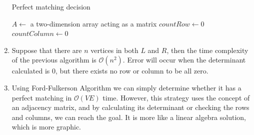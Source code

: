 \documentclass[12pt, a4paper]{article}
\begin{document}
\begin{enumerate}
          \begin{algorithm}[!htb]
              \caption{Perfect matching decision}
              \BlankLine
              \BlankLine
              $A \leftarrow$ a two-dimension array acting as a matrix\;
              \BlankLine
              $countRow \leftarrow 0$\;
              $countColumn \leftarrow 0$\;
              \;
          \end{algorithm}
    \newpage
    \item Suppose that there are $n$ vertices in both $L$ and $R$, then the time complexity of the previous algorithm is $\mathcal{O}(n^2)$. 
          Error will occur when the determinant calculated is $0$, but there exists no row or column to be all zero.
    \item Using Ford-Fulkerson Algorithm we can simply determine whether it has a perfect matching in $\mathcal{O}(VE)$ time. 
          However, this strategy uses the concept of an adjacency matrix, and by calculating its determinant or checking the rows and columns, 
          we can reach the goal. It is more like a linear algebra solution, which is more graphic.
\end{enumerate}
\end{document}
